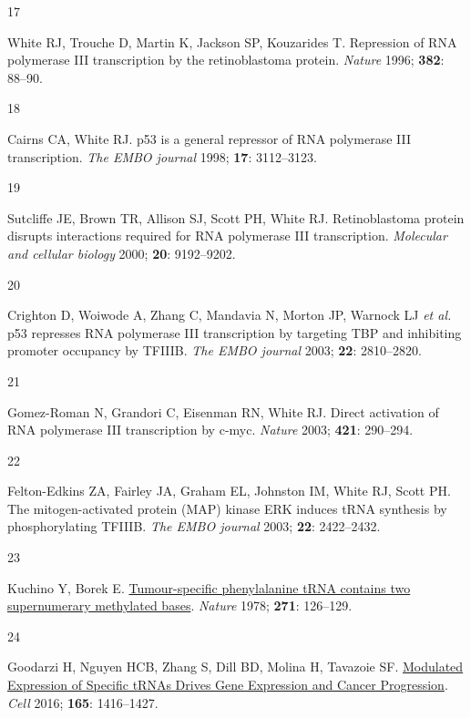 \documentclass[
  12pt,
]{article}
\newlength{\cslhangindent}
\newlength{\csllabelwidth}
\newlength{\cslentryspacingunit} %
\newenvironment{CSLReferences}[2] %
 {%
  \setlength{\parindent}{0pt}
  \ifodd #1
  \let\oldpar\par
  \def\par{\hangindent=\cslhangindent\oldpar}
  \fi
  \setlength{\parskip}{#2\cslentryspacingunit}
 }%
 {}
\newcommand{\CSLLeftMargin}[1]{\parbox[t]{\csllabelwidth}{#1}}
\newcommand{\CSLRightInline}[1]{\parbox[t]{\linewidth - \csllabelwidth}{#1}\break}
\begin{document}
\begin{CSLReferences}{0}{0}
\leavevmode{}%
\CSLLeftMargin{17 }%
\CSLRightInline{White RJ, Trouche D, Martin K, Jackson SP, Kouzarides T. Repression of {RNA} polymerase {III} transcription by the retinoblastoma protein. \emph{Nature} 1996; \textbf{382}: 88--90.}

\leavevmode{}%
\CSLLeftMargin{18 }%
\CSLRightInline{Cairns CA, White RJ. p53 is a general repressor of {RNA} polymerase {III} transcription. \emph{The EMBO journal} 1998; \textbf{17}: 3112--3123.}

\leavevmode{}%
\CSLLeftMargin{19 }%
\CSLRightInline{Sutcliffe JE, Brown TR, Allison SJ, Scott PH, White RJ. Retinoblastoma protein disrupts interactions required for {RNA} polymerase {III} transcription. \emph{Molecular and cellular biology} 2000; \textbf{20}: 9192--9202.}

\leavevmode{}%
\CSLLeftMargin{20 }%
\CSLRightInline{Crighton D, Woiwode A, Zhang C, Mandavia N, Morton JP, Warnock LJ \emph{et al.} p53 represses {RNA} polymerase {III} transcription by targeting {TBP} and inhibiting promoter occupancy by {TFIIIB}. \emph{The EMBO journal} 2003; \textbf{22}: 2810--2820.}

\leavevmode{}%
\CSLLeftMargin{21 }%
\CSLRightInline{Gomez-Roman N, Grandori C, Eisenman RN, White RJ. Direct activation of {RNA} polymerase {III} transcription by c-myc. \emph{Nature} 2003; \textbf{421}: 290--294.}

\leavevmode{}%
\CSLLeftMargin{22 }%
\CSLRightInline{Felton-Edkins ZA, Fairley JA, Graham EL, Johnston IM, White RJ, Scott PH. The mitogen-activated protein ({MAP}) kinase {ERK} induces {tRNA} synthesis by phosphorylating {TFIIIB}. \emph{The EMBO journal} 2003; \textbf{22}: 2422--2432.}

\leavevmode{}%
\CSLLeftMargin{23 }%
\CSLRightInline{Kuchino Y, Borek E. \href{https://doi.org/10.1038/271126a0}{Tumour-specific phenylalanine tRNA contains two supernumerary methylated bases}. \emph{Nature} 1978; \textbf{271}: 126--129.}

\leavevmode{}%
\CSLLeftMargin{24 }%
\CSLRightInline{Goodarzi H, Nguyen HCB, Zhang S, Dill BD, Molina H, Tavazoie SF. \href{https://doi.org/10.1016/j.cell.2016.05.046}{Modulated Expression of Specific tRNAs Drives Gene Expression and Cancer Progression}. \emph{Cell} 2016; \textbf{165}: 1416--1427.}


\end{CSLReferences}
\end{document}

